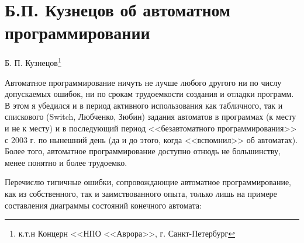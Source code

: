 \documentclass[12pt, twoside]{report}
\begin{document}
\newpage
\section*{Б.П. Кузнецов об автоматном программировании}\label{kuznetcov_about}

Б. П. Кузнецов\footnote{к.т.н Концерн <<НПО <<Аврора>>, г. Санкт-Петербург}

Автоматное программирование ничуть не лучше любого другого ни по числу допускаемых ошибок,
ни по срокам трудоемкости создания и отладки программ. В этом я убедился и в период активного
использования как табличного, так и спискового (Switch, Любченко, Зюбин) задания автоматов
в программах (к месту и не к месту) и в последующий период <<безавтоматного программирования>>
с 2003 г. по нынешний день (да и до этого, когда <<вспомнил>> об автоматах). Более того,
автоматное программирование доступно отнюдь не большинству, менее понятно и более трудоемко.

Перечислю типичные ошибки, сопровождающие автоматное программирование, как из собственного,
так и заимствованного опыта, только лишь на примере составления диаграммы состояний конечного автомата:
\end{document}
